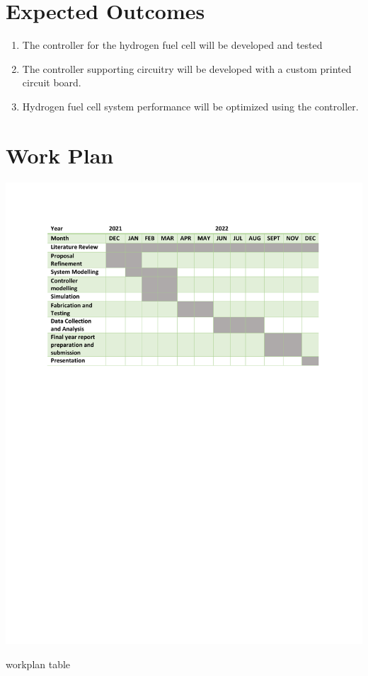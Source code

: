 \section{Expected Outcomes}
\begin{enumerate}
\item The controller for the hydrogen fuel cell will be developed and tested
\item The controller supporting circuitry will be developed with a custom printed circuit board.
\item Hydrogen fuel cell system performance will be optimized using the controller.
\end{enumerate}
\section{Work Plan}
\begin{table}[!h]
\includegraphics{Figures/workplan}
\caption{workplan table}
\end{table}